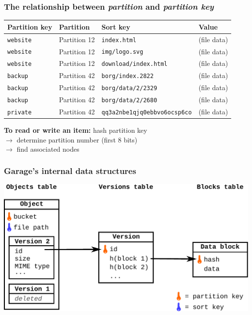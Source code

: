 \documentclass[aspectratio=169]{beamer}
\begin{document}
\begin{frame}
	\frametitle{The relationship between \emph{partition} and \emph{partition key}}
	\begin{center}
	\begin{tabular}{|l|l|l|l|}
		\hline
		\textbf{Partition key} & \textbf{Partition} & \textbf{Sort key} & \textbf{Value} \\
		\hline
		\hline
		\texttt{website} & Partition 12 & \texttt{index.html} & (file data) \\
		\hline
		\texttt{website} & Partition 12 & \texttt{img/logo.svg} & (file data) \\
		\hline
		\texttt{website} & Partition 12 &\texttt{download/index.html} & (file data) \\
		\hline
		\hline
		\texttt{backup} & Partition 42 & \texttt{borg/index.2822} & (file data) \\
		\hline
		\texttt{backup} & Partition 42 & \texttt{borg/data/2/2329} & (file data) \\
		\hline
		\texttt{backup} & Partition 42 & \texttt{borg/data/2/2680} & (file data) \\
		\hline
		\hline
		\texttt{private} & Partition 42 & \texttt{qq3a2nbe1qjq0ebbvo6ocsp6co} & (file data) \\
		\hline
	\end{tabular}
	\end{center}
	\vspace{1em}
	\textbf{To read or write an item:} hash partition key
	\\ \hspace{5cm} $\to$ determine partition number (first 8 bits)
	\\ \hspace{5cm} $\to$ find associated nodes
\end{frame}

\begin{frame}
	\frametitle{Garage's internal data structures}
	\centering
	\includegraphics[width=.75\columnwidth]{assets/garage_tables.pdf}
\end{frame}
\end{document}
